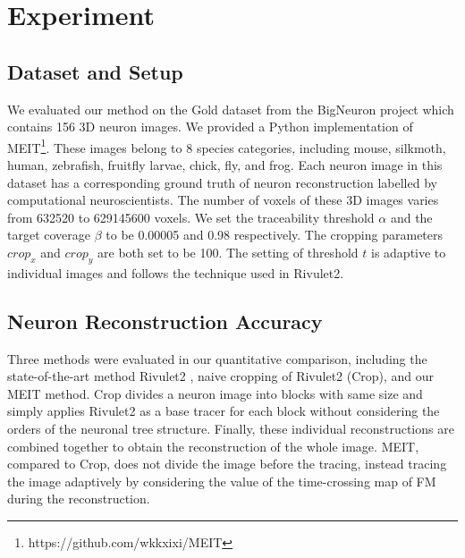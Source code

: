 \documentclass[conference]{IEEEtran}
\begin{document}
\section{Experiment}
\label{sec:experiment}
\subsection{Dataset and Setup}
We evaluated our method on the Gold dataset from the BigNeuron project which contains 156 3D neuron images. We provided a Python implementation of MEIT\footnote{https://github.com/wkkxixi/MEIT}. These images belong to 8 species categories, including mouse, silkmoth, human, zebrafish, fruitfly larvae, chick, fly, and frog. Each neuron image in this dataset has a corresponding ground truth of neuron reconstruction labelled by computational neuroscientists. The number of voxels of these 3D images varies from 632520 to 629145600 voxels. 
We set the traceability threshold $\alpha$ and the target coverage $\beta$ to be 0.00005 and 0.98 respectively. The cropping parameters $crop_x$ and $crop_y$ are both set to be 100. The setting of threshold $t$  is adaptive to individual images and follows the technique used in Rivulet2.

\subsection{Neuron Reconstruction Accuracy}
\label{sec:v-q-compare}
Three methods were evaluated in our quantitative comparison, including the state-of-the-art method Rivulet2 \cite{r2}, naive cropping of Rivulet2 (Crop), and our MEIT method.  Crop divides a neuron image into blocks with same size and simply applies Rivulet2 as a base tracer for each block without considering the orders of the neuronal tree structure. Finally, these individual reconstructions are combined together to obtain the reconstruction of the whole image. MEIT, compared to Crop, does not divide the image before the tracing, instead tracing the image adaptively by considering the value of the time-crossing map of FM during the reconstruction.  
\end{document}
